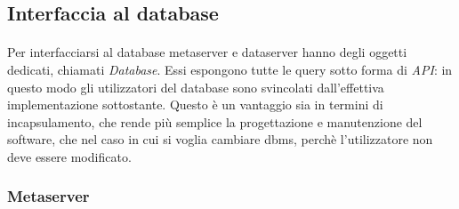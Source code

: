 \documentclass{article}
\begin{document}
\subsection{Interfaccia al database}

\paragraph{} Per interfacciarsi al database metaserver e dataserver hanno degli oggetti dedicati, chiamati \emph{Database}. Essi espongono tutte le query sotto forma di \emph{API}: in questo modo gli utilizzatori del database sono svincolati dall'effettiva implementazione sottostante. Questo è un vantaggio sia in termini di incapsulamento, che rende più semplice la progettazione e manutenzione del software, che nel caso in cui si voglia cambiare dbms, perchè l'utilizzatore non deve essere modificato. 

\subsubsection{Metaserver}
\end{document}
